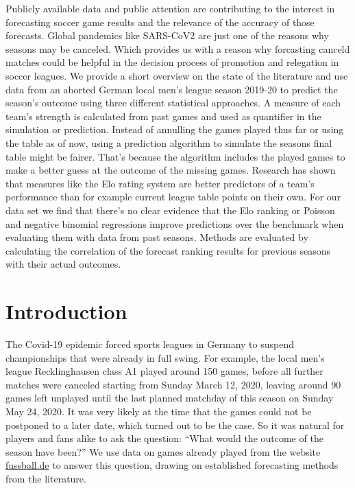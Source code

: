 \documentclass[12pt,a4paper]{article}
\begin{document}
Publicly available data and public attention are contributing to the
interest in forecasting soccer game results and the relevance of the
accuracy of those forecasts. Global pandemics like SARS-CoV2 are just
one of the reasons why seasons may be canceled. Which provides us with a
reason why forcasting canceld matches could be helpful in the decision
process of promotion and relegation in soccer leagues. We provide a
short overview on the state of the literature and use data from an
aborted German local men's league season 2019-20 to predict the season's
outcome using three different statistical approaches. A measure of each
team's strength is calculated from past games and used as quantifier in
the simulation or prediction. Instead of annulling the games played thus
far or using the table as of now, using a prediction algorithm to
simulate the seasons final table might be fairer. That's because the
algorithm includes the played games to make a better guess at the
outcome of the missing games. Research has shown that measures like the
Elo rating system are better predictors of a team's performance than for
example current league table points on their own. For our data set we
find that there's no clear evidence that the Elo ranking or Poisson and
negative binomial regressions improve predictions over the benchmark
when evaluating them with data from past seasons. Methods are evaluated
by calculating the correlation of the forecast ranking results for
previous seasons with their actual outcomes.

\hypertarget{introduction}{%
\section{Introduction}\label{introduction}}

The Covid-19 epidemic forced sports leagues in Germany to suspend
championships that were already in full swing. For example, the local
men's league Recklinghausen class A1 played around 150 games, before all
further matches were canceled starting from Sunday March 12, 2020,
leaving around 90 games left unplayed until the last planned matchday of
this season on Sunday May 24, 2020. It was very likely at the time that
the games could not be postponed to a later date, which turned out to be
the case. So it was natural for players and fans alike to ask the
question: \enquote{What would the outcome of the season have been?} We
use data on games already played from the website
\href{http://www.fussball.de/spieltagsuebersicht/re-kl-a-1-kreis-recklinghausen-kreisliga-a-herren-saison1920-westfalen/-/staffel/027II28DH8000009VS5489B3VS3GHJJU-G\#!/}{fussball.de}
to answer this question, drawing on established forecasting methods from
the literature.
\end{document}
